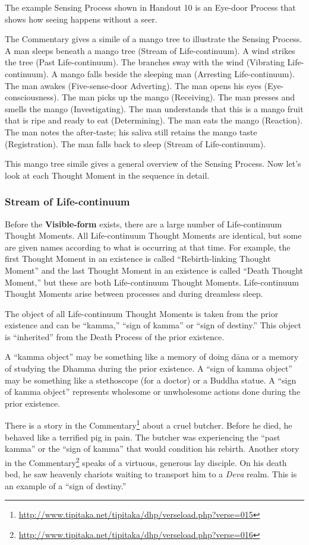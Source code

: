 The example Sensing Process shown in Handout 10 is an Eye-door Process that shows how seeing happens without a seer.

The Commentary gives a simile of a mango tree to illustrate the Sensing Process. A man sleeps beneath a mango tree (Stream of Life-continuum). A wind strikes the tree (Past Life-continuum). The branches sway with the wind (Vibrating Life-continuum). A mango falls beside the sleeping man (Arresting Life-continuum). The man awakes (Five-sense-door Adverting). The man opens his eyes (Eye-consciousness). The man picks up the mango (Receiving). The man presses and smells the mango (Investigating). The man understands that this is a mango fruit that is ripe and ready to eat (Determining). The man eats the mango (Reaction). The man notes the after-taste; his saliva still retains the mango taste (Registration). The man falls back to sleep (Stream of Life-continuum).

This mango tree simile gives a general overview of the Sensing Process. Now let’s look at each Thought Moment in the sequence in detail.

\subsubsection*{Stream of Life-continuum}

Before the \textbf{Visible-form} exists, there are a large number of Life-continuum Thought Moments. All Life-continuum Thought Moments are identical, but some are given names according to what is occurring at that time. For example, the first Thought Moment in an existence is called “Rebirth-linking Thought Moment” and the last Thought Moment in an existence is called “Death Thought Moment,” but these are both Life-continuum Thought Moments. Life-continuum Thought Moments arise between processes and during dreamless sleep.

The object of all Life-continuum Thought Moments is taken from the prior existence and can be “kamma,” “sign of kamma” or “sign of destiny.” This object is “inherited” from the Death Process of the prior existence. 

A “kamma object” may be something like a memory of doing dāna or a memory of studying the Dhamma during the prior existence. A “sign of kamma object” may be something like a stethoscope (for a doctor) or a Buddha statue. A “sign of kamma object” represents wholesome or unwholesome actions done during the prior existence. 

There is a story in the Commentary\footnote{\url{http://www.tipitaka.net/tipitaka/dhp/verseload.php?verse=015}} about a cruel butcher. Before he died, he behaved like a terrified pig in pain. The butcher was experiencing the “past kamma” or the “sign of kamma” that would condition his rebirth. Another story in the Commentary\footnote{\url{http://www.tipitaka.net/tipitaka/dhp/verseload.php?verse=016}} speaks of a virtuous, generous lay disciple. On his death bed, he saw heavenly chariots waiting to transport him to a \textit{Deva} realm. This is an example of a “sign of destiny.”

